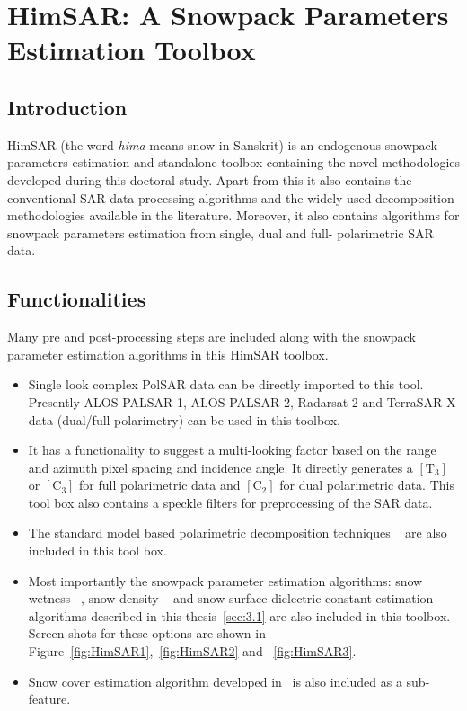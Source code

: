 \chapter{HimSAR: A Snowpack Parameters Estimation Toolbox}

\section{Introduction}
HimSAR (the word \textit{hima} means snow in Sanskrit) is an endogenous snowpack parameters estimation and standalone toolbox containing the novel methodologies developed during this doctoral study. Apart from this it also contains the conventional SAR data processing algorithms and the widely used decomposition methodologies available in the literature. Moreover, it also contains algorithms for snowpack parameters estimation from single, dual and full- polarimetric SAR data. 

\section{Functionalities}
Many pre and post-processing steps are included along with the snowpack parameter estimation algorithms in this HimSAR toolbox.

\begin{itemize}
	\item Single look complex PolSAR data can be directly imported to this tool. Presently ALOS PALSAR-1, ALOS PALSAR-2, Radarsat-2 and TerraSAR-X data (dual/full polarimetry)  can be used in this toolbox. 
	\item It has a functionality to suggest a multi-looking factor based on the range and azimuth pixel spacing and incidence angle. It directly generates a ${[\mbox{T}_3]}$ or ${[\mbox{C}_3]}$ for full polarimetric data and ${[\mbox{C}_2]}$ for dual polarimetric data. This tool box also contains a speckle filters for preprocessing of the SAR data.
	\item The standard model based polarimetric decomposition techniques ~\citep{freeman98,Yamaguchi2005,singh13,bhattacharya2015adaptive} are also included in this tool box. 
	\item Most importantly the snowpack parameter estimation algorithms: snow wetness ~\citep{Shi95wetness,surendar2015snowwetness,bhattacharya2014snow}, snow density ~\citep{Shi2000,surendar2015snowdensity} and snow surface dielectric constant estimation algorithms described in this thesis~\cref{sec:3.1} are also included in this toolbox. Screen shots for these options are shown in Figure~\ref{fig:HimSAR1},~\ref{fig:HimSAR2} and ~\ref{fig:HimSAR3}.
	\item Snow cover estimation algorithm developed in~\cite{singh2012a} is also included as a sub-feature.  
\end{itemize}

